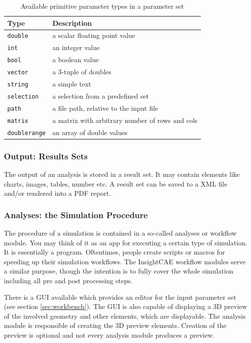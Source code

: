 \begin{table}[h!]
\centering
\begin{tabular}{ll}
\hline
Type & Description \\
\hline\hline
\texttt{double} & a scalar floating point value\\
\texttt{int} & an integer value\\
\texttt{bool} & a boolean value\\
\texttt{vector} & a 3-tuple of doubles\\
\texttt{string} & a simple text\\
\texttt{selection} & a selection from a predefined set\\
\texttt{path} & a file path, relative to the input file\\
\texttt{matrix} & a matrix with arbitrary number of rows and cols\\
\texttt{doublerange} & an array of double values\\
\hline
\end{tabular}
\caption{Available primitive parameter types in a parameter set}
\label{tab:parameters}
\end{table}

\subsubsection{Output: Results Sets}

The output of an analysis is stored in a result set. 
It may contain elements like charts, images, tables, number etc.
A result set can be saved to a XML file and/or rendered into a PDF report.

\subsubsection{Analyses: the Simulation Procedure}

The procedure of a simulation is contained in a so-called analyses or workflow module.
You may think of it as an app for executing a certain type of simulation.
It is essentially a program.
Oftentimes, people create scripts or macros for speeding up their simulation workflows.
The InsightCAE workflow modules serve a similar purpose, though the intention is to fully cover the whole simulation including all pre and post processing steps.

There is a GUI available which provides an editor for the input parameter set (see section \ref{sec:workbench}).
The GUI is also capable of displaying a 3D preview of the involved geometry and other elements, which are displayable.
The analysis module is responsible of creating the 3D preview elements.
Creation of the preview is optional and not every analysis module produces a preview.

